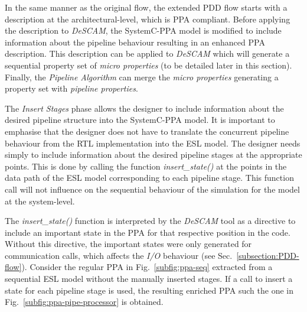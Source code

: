 In the same manner as the original flow, the extended PDD flow starts with a description at the architectural-level, which is PPA compliant. Before applying the description to \textit{DeSCAM}, the SystemC-PPA model is modified to include information about the pipeline behaviour resulting in an enhanced PPA description. This description can be applied to \textit{DeSCAM} which will generate a sequential property set of \textit{micro properties} (to be detailed later in this section). Finally, the \textit{Pipeline Algorithm} can merge the \textit{micro properties} generating a property set with \textit{pipeline properties}.

The \textit{Insert Stages} phase allows the designer to include information about the desired pipeline structure into the SystemC-PPA model. It is important to emphasise that the designer does not have to translate the concurrent pipeline behaviour from the RTL implementation into the ESL model. The designer needs simply to include information about the desired pipeline stages at the appropriate points. This is done by calling the function \textit{insert\_state()} at the points in the data path of the ESL model corresponding to each pipeline stage. This function call will not influence on the sequential behaviour of the simulation for the model at the system-level.

The \textit{insert\_state()} function is interpreted by the \textit{DeSCAM} tool as a directive to include an important state in the PPA for that respective position in the code. Without this directive, the important states were only generated for communication calls, which affects the \textit{I/O} behaviour (see Sec.~\ref{subsection:PDD-flow}). Consider the regular PPA in Fig.~\ref{subfig:ppa-seq} extracted from a sequential ESL model without the manually inserted stages. If a call to insert a state for each pipeline stage is used, the resulting enriched PPA such the one in Fig.~\ref{subfig:ppa-pipe-processor} is obtained.

